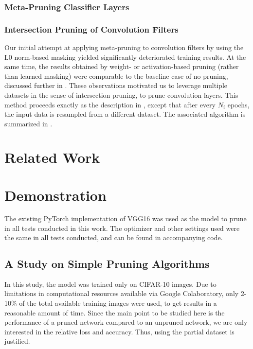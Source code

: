 \documentclass{article}
\begin{document}
\subsubsection{Meta-Pruning Classifier Layers} \label{metaPruneClass}


\subsubsection{Intersection Pruning of Convolution Filters} \label{intersectPruneFilter}

Our initial attempt at applying meta-pruning to convolution filters by using the L0 norm-based masking yielded significantly deteriorated training results. At the same time, the results obtained by weight- or activation-based pruning (rather than learned masking) were comparable to the baseline case of no pruning, discussed further in . These observations motivated us to leverage multiple datasets in the sense of intersection pruning, to prune convolution layers. This method proceeds exactly as the description in , except that after every $N_i$ epochs, the input data is resampled from a different dataset. The associated algorithm is summarized in .




\section{Related Work}


\section{Demonstration}

The existing PyTorch implementation of VGG16 was used as the model to prune in all tests conducted in this work. The optimizer and other settings used were the same in all tests conducted, and can be found in accompanying code.

\subsection{A Study on Simple Pruning Algorithms}

In this study, the model was trained only on CIFAR-10 images. Due to limitations in computational resources available via Google Colaboratory, only 2-10\% of the total available training images were used, to get results in a reasonable amount of time. Since the main point to be studied here is the performance of a pruned network compared to an unpruned network, we are only interested in the relative loss and accuracy. Thus, using the partial dataset is justified.
\end{document}

